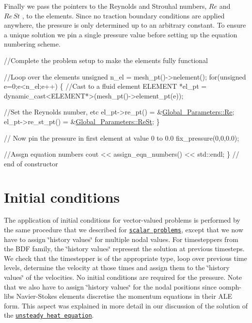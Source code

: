Finally we pass the pointers to the Reynolds and Strouhal numbers, $ Re $ and $ Re\, St $ , to the elements. Since no traction boundary conditions are applied anywhere, the pressure is only determined up to an arbitrary constant. To ensure a unique solution we pin a single pressure value before setting up the equation numbering scheme.


\begin{DoxyCodeInclude}

 \textcolor{comment}{//Complete the problem setup to make the elements fully functional}

 \textcolor{comment}{//Loop over the elements}
 \textcolor{keywordtype}{unsigned} n\_el = mesh\_pt()->nelement();
 \textcolor{keywordflow}{for}(\textcolor{keywordtype}{unsigned} e=0;e<n\_el;e++)
  \{
   \textcolor{comment}{//Cast to a fluid element}
   ELEMENT *el\_pt = \textcolor{keyword}{dynamic\_cast<}ELEMENT*\textcolor{keyword}{>}(mesh\_pt()->element\_pt(e));

   \textcolor{comment}{//Set the Reynolds number, etc}
   el\_pt->re\_pt() = &\hyperlink{namespaceGlobal__Parameters_a9d72e94a9305c6a310940a6a427ebe06}{Global\_Parameters::Re};
   el\_pt->re\_st\_pt() = &\hyperlink{namespaceGlobal__Parameters_a7a59a32365e87566069e458dc83bd18a}{Global\_Parameters::ReSt};
  \}

 \textcolor{comment}{// Now pin the pressure in first element at value 0 to 0.0}
 fix\_pressure(0,0,0.0);

 \textcolor{comment}{//Assgn equation numbers}
 cout << assign\_eqn\_numbers() << std::endl; 
\} \textcolor{comment}{// end of constructor}

\end{DoxyCodeInclude}




 

\hypertarget{index_IC}{}\section{Initial conditions}\label{index_IC}
The application of initial conditions for vector-\/valued problems is performed by the same procedure that we described for \href{../../../unsteady_heat/two_d_unsteady_heat/html/index.html#IC}{\tt scalar problems}, except that we now have to assign \char`\"{}history
values\char`\"{} for multiple nodal values. For timesteppers from the B\+DF family, the \char`\"{}history values\char`\"{} represent the solution at previous timesteps. We check that the timestepper is of the appropriate type, loop over previous time levels, determine the velocity at those times and assign them to the \char`\"{}history values\char`\"{} of the velocities. No initial conditions are required for the pressure. Note that we also have to assign \char`\"{}history values\char`\"{} for the nodal positions since {\ttfamily oomph-\/lib\textquotesingle{}s} Navier-\/\+Stokes elements discretise the momentum equations in their A\+LE form. This aspect was explained in more detail in our discussion of the solution of the \href{../../../unsteady_heat/two_d_unsteady_heat/html/index.html#IC}{\tt unsteady heat equation}.


